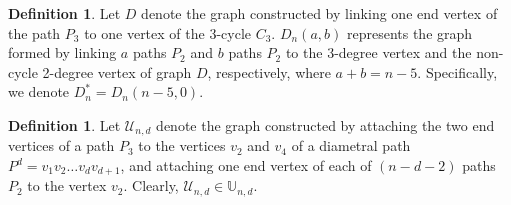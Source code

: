 \documentclass[12pt]{article}
\theoremstyle{definition}
\newtheorem{definition}[theorem]{Definition}
\newcommand{\UU}{\mathbb{U}}
\begin{document}
\begin{definition}
Let \(D\) denote the graph constructed by linking one end vertex of the path \(P_3\) to one vertex of the 3-cycle \(C_3\). \(D_n(a,b)\) represents the graph formed by linking \(a\) paths \(P_2\) and \(b\) paths \(P_2\) to the 3-degree vertex and the non-cycle 2-degree vertex of graph \(D\), respectively, where \(a + b = n-5\). Specifically, we denote \(D_n^* = D_n(n-5,0)\).
\end{definition}

\begin{definition}
Let \(\mathcal{U}_{n,d}\) denote the graph constructed by attaching the two end vertices of a path \(P_3\) to the vertices \(v_2\) and \(v_4\) of a diametral path \(P^d = v_1v_2\ldots v_d v_{d+1}\), and attaching one end vertex of each of \((n-d-2)\) paths \(P_2\) to the vertex \(v_2\). Clearly, \(\mathcal{U}_{n,d} \in \UU_{n,d}\).
\end{definition}
\end{document}
